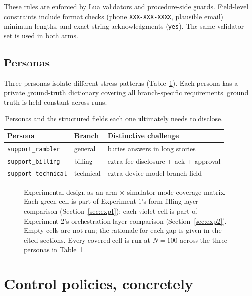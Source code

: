 \documentclass[11pt,a4paper]{article}
\begin{document}
These rules are enforced by Lua validators and procedure-side guards. Field-level constraints include format checks (phone \texttt{XXX-XXX-XXXX}, plausible email), minimum lengths, and exact-string acknowledgments (\texttt{yes}). The same validator set is used in both arms.

\subsection{Personas}

Three personas isolate different stress patterns (Table~\ref{tab:personas}). Each persona has a private ground-truth dictionary covering all branch-specific requirements; ground truth is held constant across runs.

\begin{table}[htbp]
  \centering
  \small
  \caption{Personas and the structured fields each one ultimately needs to disclose.}
  \label{tab:personas}
  \begin{tabular}{lll}
    \toprule
    Persona & Branch & Distinctive challenge \\
    \midrule
    \texttt{support\_rambler}   & general    & buries answers in long stories \\
    \texttt{support\_billing}   & billing    & extra fee disclosure + ack + approval \\
    \texttt{support\_technical} & technical  & extra device-model branch field \\
    \bottomrule
  \end{tabular}
\end{table}

\begin{figure}[htbp]
  \centering
  
  \caption{Experimental design as an arm $\times$ simulator-mode coverage
  matrix. Each green cell is part of Experiment 1's form-filling-layer
  comparison (Section~\ref{sec:exp1}); each violet cell is part of
  Experiment 2's orchestration-layer comparison (Section~\ref{sec:exp2}).
  Empty cells are not run; the rationale for each gap is given in the cited
  sections. Every covered cell is run at $N=100$ across the three personas
  in Table~\ref{tab:personas}.}
  \label{fig:coverage-matrix}
\end{figure}

\section{Control policies, concretely}
\label{sec:policies}
\end{document}
